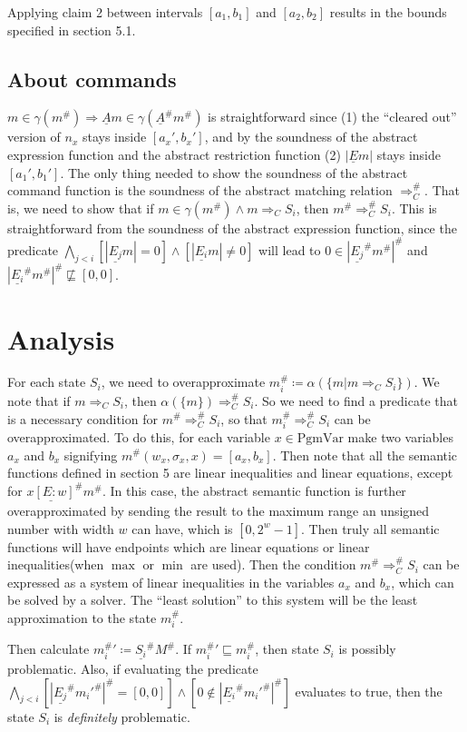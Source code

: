 \documentclass[fleqn]{article}
\theoremstyle{definition}
\begin{document}
Applying claim 2 between intervals $[a_{1},b_{1}]$ and $[a_{2},b_{2}]$ results in the bounds specified in section 5.1.

\subsection{About commands} $m\in\gamma(m^{\#})\Rightarrow\underline{A}m\in\gamma(\underline{A}^{\#}m^{\#})$ is straightforward since (1) the ``cleared out'' version of $n_{x}$ stays inside $[a_{x}',b_{x}']$, and by the soundness of the abstract expression function and the abstract restriction function (2) $|\underline{E}m|$ stays inside $[a_{1}',b_{1}']$. The only thing needed to show the soundness of the abstract command function is the soundness of the abstract matching relation $\Rightarrow_{C}^{\#}$. That is, we need to show that if $m\in\gamma(m^{\#})\wedge m\Rightarrow_{C}S_{i}$, then $m^{\#}\Rightarrow_{C}^{\#}S_{i}$. This is straightforward from the soundness of the abstract expression function, since the predicate
$\bigwedge_{j<i}[|\underline{E_{j}}m|=0]\wedge[|\underline{E_{i}}m|\neq 0]$ will lead to $0\in|\underline{E_{j}}^{\#}m^{\#}|^{\#}$ and $|\underline{E_{i}}^{\#}m^{\#}|^{\#}\not\sqsubseteq[0,0]$.
\section{Analysis}
For each state $S_{i}$, we need to overapproximate $m_{i}^{\#} \coloneq \alpha(\{m | m\Rightarrow_{C} S_{i}\})$. We note that if $m\Rightarrow_{C}S_{i}$, then $\alpha(\{m\})\Rightarrow_{C}^{\#}S_{i}$. So we need to find a predicate that is a necessary condition for $m^{\#}\Rightarrow_{C}^{\#}S_{i}$, so that $m_{i}^{\#}\Rightarrow_{C}^{\#}S_{i}$ can be overapproximated. To do this, for each variable $x\in\text{PgmVar}$ make two variables $a_{x}$ and $b_{x}$ signifying $m^{\#}(w_{x},\sigma_{x},x)=[a_{x},b_{x}]$. Then note that all the semantic functions defined in section 5 are linear inequalities and linear equations, except for $\underline{x[E:w]}^{\#}m^{\#}$. In this case, the abstract semantic function is further overapproximated by sending the result to the maximum range an unsigned number with width $w$ can have, which is $[0,2^{w}-1]$. Then truly all semantic functions will have endpoints which are linear equations or linear inequalities(when $\max$ or $\min$ are used). Then the condition $m^{\#}\Rightarrow_{C}^{\#}S_{i}$ can be expressed as a system of linear inequalities in the variables $a_{x}$ and $b_{x}$, which can be solved by a solver. The ``least solution'' to this system will be the least approximation to the state $m_{i}^{\#}$.

Then calculate $m^{\#}_{i}\prime \coloneq \underline{S_{i}}^{\#}M^{\#}$. If $m^{\#}_{i}\prime \sqsubseteq m^{\#}_{i}$, then state $S_{i}$ is possibly problematic. Also, if evaluating the predicate $\bigwedge_{j<i}[|\underline{E_{j}}^{\#}m_{i}'^{\#}|^{\#}=[0,0]]\wedge[0\not\in|\underline{E_{i}}^{\#}m_{i}'^{\#}|^{\#}]$ evaluates to true, then the state $S_{i}$ is \textit{definitely} problematic.
\end{document}
